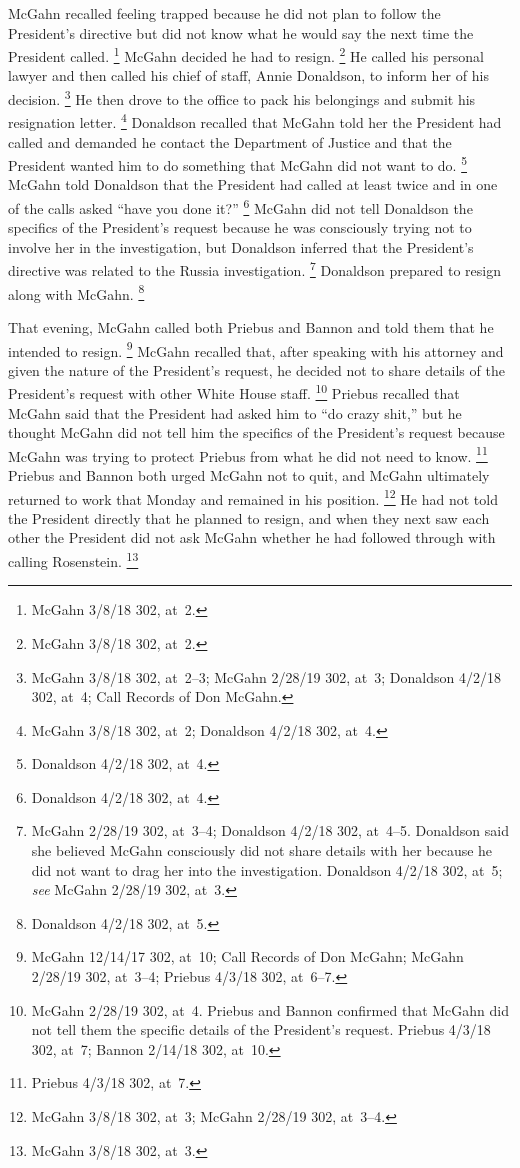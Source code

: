 McGahn recalled feeling trapped because he did not plan to follow the President's directive but did not know what he would say the next time the President called.%
\footnote{McGahn 3/8/18 302, at~2.}
McGahn decided he had to resign.%
\footnote{McGahn 3/8/18 302, at~2.}
He called his personal lawyer and then called his chief of staff, Annie Donaldson, to inform her of his decision.%
\footnote{McGahn 3/8/18 302, at~2--3;
McGahn 2/28/19 302, at~3;
Donaldson 4/2/18 302, at~4;
Call Records of Don McGahn.}
He then drove to the office to pack his belongings and submit his resignation letter.%
\footnote{McGahn 3/8/18 302, at~2;
Donaldson 4/2/18 302, at~4.}
Donaldson recalled that McGahn told her the President had called and demanded he contact the Department of Justice and that the President wanted him to do something that McGahn did not want to do.%
\footnote{Donaldson 4/2/18 302, at~4.}
McGahn told Donaldson that the President had called at least twice and in one of the calls asked ``have you done it?''%
\footnote{Donaldson 4/2/18 302, at~4.}
McGahn did not tell Donaldson the specifics of the President's request because he was consciously trying not to involve her in the investigation, but Donaldson inferred that the President's directive was related to the Russia investigation.%
\footnote{McGahn 2/28/19 302, at~3--4;
Donaldson 4/2/18 302, at~4--5.
Donaldson said she believed McGahn consciously did not share details with her because he did not want to drag her into the investigation.
Donaldson 4/2/18 302, at~5;
\textit{see} McGahn 2/28/19 302, at~3.}
Donaldson prepared to resign along with McGahn.%
\footnote{Donaldson 4/2/18 302, at~5.}

That evening, McGahn called both Priebus and Bannon and told them that he intended to resign.%
\footnote{McGahn 12/14/17 302, at~10;
Call Records of Don McGahn;
McGahn 2/28/19 302, at~3--4;
Priebus 4/3/18 302, at~6--7.}
McGahn recalled that, after speaking with his attorney and given the nature of the President's request, he decided not to share details of the President's request with other White House staff.%
\footnote{McGahn 2/28/19 302, at~4.
Priebus and Bannon confirmed that McGahn did not tell them the specific details of the President's request.
Priebus 4/3/18 302, at~7;
Bannon 2/14/18 302, at~10.}
Priebus recalled that McGahn said that the President had asked him to ``do crazy shit,'' but he thought McGahn did not tell him the specifics of the President's request because McGahn was trying to protect Priebus from what he did not need to know.%
\footnote{Priebus 4/3/18 302, at~7.}
Priebus and Bannon both urged McGahn not to quit, and McGahn ultimately returned to work that Monday and remained in his position.%
\footnote{McGahn 3/8/18 302, at~3;
McGahn 2/28/19 302, at~3--4.}
He had not told the President directly that he planned to resign, and when they next saw each other the President did not ask McGahn whether he had followed through with calling Rosenstein.%
\footnote{McGahn 3/8/18 302, at~3.}

